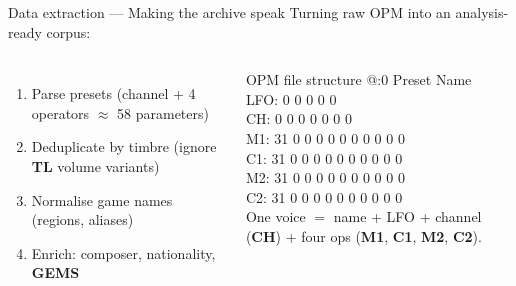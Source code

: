 \documentclass[aspectratio=169,11pt]{beamer}
\begin{document}
\begin{frame}{Data extraction --- Making the archive speak}
  Turning raw OPM into an analysis-ready corpus:
  \vspace{0.5mm}
  \begin{columns}[T,onlytextwidth]
    \begin{enumerate}
      \item Parse presets (channel + 4 operators $\approx$ 58 parameters)
      \item Deduplicate by timbre (ignore \textbf{TL} volume variants)
      \item Normalise game names (regions, aliases)
      \item Enrich: composer, nationality, \textbf{GEMS}
    \end{enumerate}
    \begin{block}{OPM file structure}
      {\ttfamily\scriptsize
      @:0 Preset Name\\
      LFO: 0 0 0 0 0\\
      CH: 0 0 0 0 0 0 0\\
      M1: 31 0 0 0 0 0 0 0 0 0 0\\
      C1: 31 0 0 0 0 0 0 0 0 0 0\\
      M2: 31 0 0 0 0 0 0 0 0 0 0\\
      C2: 31 0 0 0 0 0 0 0 0 0 0%
      }\\[1mm]
      {\scriptsize\color{kasserMuted}
      One voice $=$ name + LFO + channel (\textbf{CH}) + four ops (\textbf{M1}, \textbf{C1}, \textbf{M2}, \textbf{C2}).}
    \end{block}
  \end{columns}
\end{frame}
\end{document}
